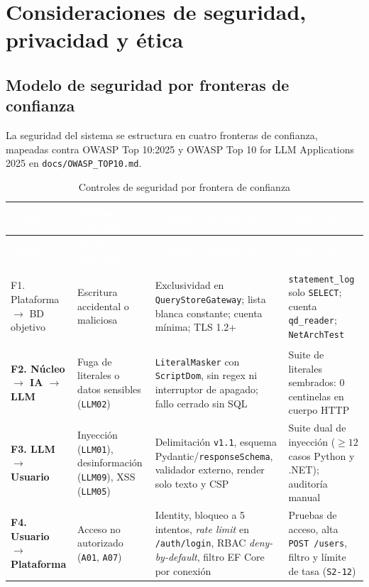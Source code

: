 \documentclass[12pt,a4paper]{article}
\begin{document}
\section{Consideraciones de seguridad, privacidad y ética}

\subsection{Modelo de seguridad por fronteras de confianza}

La seguridad del sistema se estructura en cuatro fronteras de confianza, mapeadas contra OWASP Top 10:2025 y OWASP Top 10 for LLM Applications 2025 \cite{owasp-llm} en \texttt{docs/OWASP\_TOP10.md}.

\begingroup
{}
\scriptsize
\begin{longtable}{>{\bfseries}p{} p{} p{} p{}}
\toprule
\rowcolor{utbblue}
\textcolor{white}{\textbf{Frontera}} & \textcolor{white}{\textbf{Amenaza principal}} & \textcolor{white}{\textbf{Control arquitectónico}} & \textcolor{white}{\textbf{Verificación}} \\
\midrule
\endfirsthead
\toprule
\rowcolor{utbblue}
\textcolor{white}{\textbf{Frontera}} & \textcolor{white}{\textbf{Amenaza principal}} & \textcolor{white}{\textbf{Control arquitectónico}} & \textcolor{white}{\textbf{Verificación}} \\
\midrule
\endhead
\bottomrule
\caption{Controles de seguridad por frontera de confianza}
\label{tab:fronteras}
\endlastfoot
F1. Plataforma $\rightarrow$ BD objetivo & Escritura accidental o maliciosa & Exclusividad en \texttt{QueryStoreGateway}; lista blanca constante; cuenta mínima; TLS 1.2+ \cite{rfc-tls} & \texttt{statement\_log} solo \texttt{SELECT}; cuenta \texttt{qd\_reader}; \texttt{NetArchTest} \\
F2. Núcleo $\rightarrow$ IA $\rightarrow$ LLM & Fuga de literales o datos sensibles (\texttt{LLM02}) & \texttt{LiteralMasker} con \texttt{ScriptDom}, sin regex ni interruptor de apagado; fallo cerrado sin SQL & Suite de literales sembrados: 0 centinelas en cuerpo HTTP \\
F3. LLM $\rightarrow$ Usuario & Inyección (\texttt{LLM01}), desinformación (\texttt{LLM09}), XSS (\texttt{LLM05}) & Delimitación \texttt{v1.1}, esquema Pydantic/\texttt{responseSchema}, validador externo, render solo texto y CSP & Suite dual de inyección ($\ge 12$ casos Python y .NET); auditoría manual \\
F4. Usuario $\rightarrow$ Plataforma & Acceso no autorizado (\texttt{A01}, \texttt{A07}) & Identity, bloqueo a 5 intentos, \textit{rate limit} en \texttt{/auth/login}, RBAC \textit{deny-by-default}, filtro EF Core por conexión & Pruebas de acceso, alta \texttt{POST /users}, filtro y límite de tasa (\texttt{S2-12}) \\
\end{longtable}
\endgroup
\end{document}
